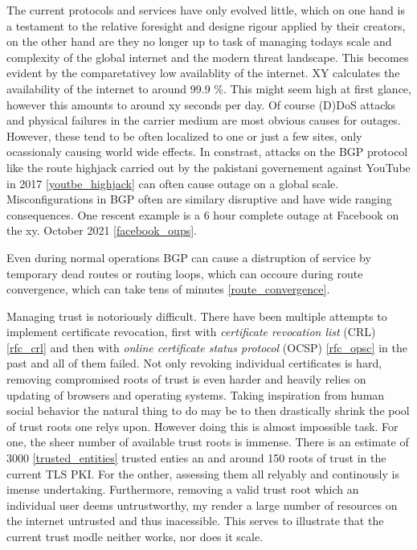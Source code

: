 \documentclass[../eva1_scion.tex]{subfiles}
\begin{document}
The current protocols and services have only evolved little, which on one hand is a testament to the relative foresight and designe rigour applied by their creators, on the other hand are they no longer up to task of managing todays scale and complexity of the global internet and the modern threat landscape. This becomes evident by the comparetativey low availablity of the internet. XY calculates the availability of the internet to around 99.9 \%. This might seem high at first glance, however this amounts to around xy seconds per day. Of course (D)DoS attacks and physical failures in the carrier medium are most obvious causes for outages. However, these tend to be often localized to one or just a few sites, only ocassionaly causing world wide effects. In constrast, attacks on the BGP protocol like the route highjack carried out by the pakistani governement against YouTube in 2017 \ref{youtbe_highjack} can often cause outage on a global scale. Misconfigurations in BGP often are similary disruptive and have wide ranging consequences. One rescent example is a 6 hour complete outage at Facebook on the xy. October 2021 \ref{facebook_oups}.

Even during normal operations BGP can cause a distruption of service by temporary dead routes or routing loops, which can occoure during route convergence, which can take tens of minutes \ref{route_convergence}.

Managing trust is notoriously difficult. There have been multiple attempts to implement certificate revocation, first with \textit{certificate revocation list} (CRL) \ref{rfc_crl} and then with \textit{online certificate status protocol} (OCSP) \ref{rfc_opsc} in the past and all of them failed. Not only revoking individual certificates is hard, removing compromised roots of trust is even harder and heavily relies on updating of browsers and operating systems. Taking inspiration from human social behavior the natural thing to do may be to then drastically shrink the pool of trust roots one relys upon. However doing this is almost impossible task. For one, the sheer number of available trust roots is immense. There is an estimate of 3000 \ref{trusted_entities} trusted enties an and around 150 roots of trust in the current TLS PKI. For the onther, assessing them all relyably and continously is imense undertaking. Furthermore, removing a valid trust root which an individual user deems untrustworthy, my render a large number of resources on the internet untrusted and thus inacessible. This serves to illustrate that the current trust modle neither works, nor does it scale. 
\end{document}
